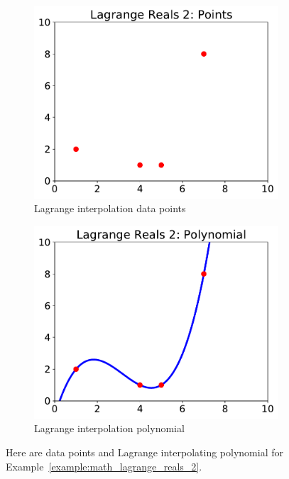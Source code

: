 \begin{figure}[t]
\centering
    \begin{subfigure}[t]{0.45\textwidth}
    \includegraphics[width=\textwidth]{plots/lagrange/lagrange_reals_points_2.pdf}
    \caption{Lagrange interpolation data points}
    \label{fig:lagrange_points_2}
    \end{subfigure}
    \begin{subfigure}[t]{0.45\textwidth}
    \includegraphics[width=\textwidth]{plots/lagrange/lagrange_reals_poly_2.pdf}
    \caption{Lagrange interpolation polynomial}
    \label{fig:lagrange_poly_2}
    \end{subfigure}
    \caption[Data points and Lagrange Interpolation over the reals 2]{Here
        are data points and Lagrange interpolating polynomial
        for Example~\ref{example:math_lagrange_reals_2}.}
\end{figure}

